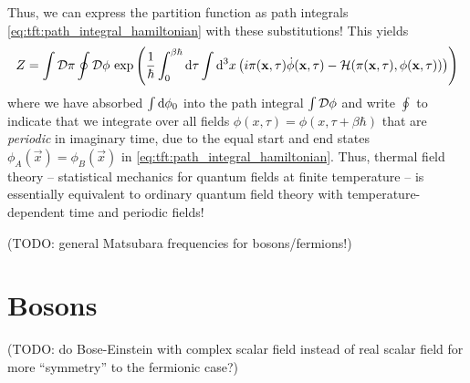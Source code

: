 Thus, we can express the partition function as path integrals \eqref{eq:tft:path_integral_hamiltonian} with these substitutions!
This yields
\begin{equation}
	Z = \int \mathcal{D} \pi \oint \mathcal{D} \phi \, \exp \left( \frac{1}{\hbar} \int_0^{\beta \hbar} \mathop{}\!\mathrm{d} \tau \int \mathop{}\!\mathrm{d}^3 x \left( i \pi(\mathbf{x}, \tau) \dot{\phi}(\mathbf{x}, \tau) - \mathcal{H}(\pi(\mathbf{x}, \tau), \phi(\mathbf{x}, \tau)) \right) \right)
\label{eq:tft:partition_function}
\end{equation}
where we have absorbed $\int \mathop{}\!\mathrm{d} \phi_0$ into the path integral $\int \mathcal{D} \phi$ and write $\oint$ to indicate that we integrate over all fields $\phi(x, \tau) = \phi(x, \tau + \beta \hbar)$ that are \emph{periodic} in imaginary time, due to the equal start and end states $\phi_A(\vec{x}) = \phi_B(\vec{x})$ in \cref{eq:tft:path_integral_hamiltonian}.
Thus, thermal field theory -- statistical mechanics for quantum fields at finite temperature -- is essentially equivalent to ordinary quantum field theory with temperature-dependent time and periodic fields!

(TODO: general Matsubara frequencies for bosons/fermions!)

\section{Bosons}

(TODO: do Bose-Einstein with complex scalar field instead of real scalar field for more ``symmetry'' to the fermionic case?)

